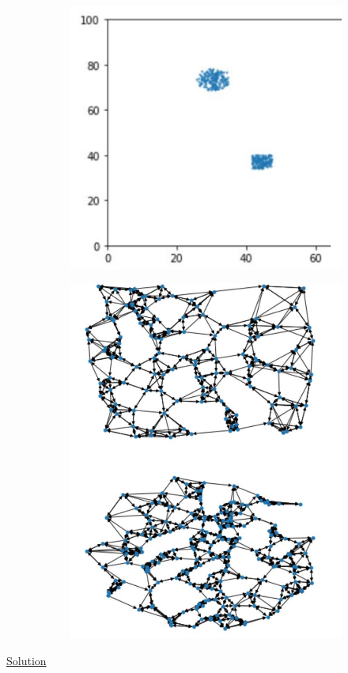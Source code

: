 \begin{figure}[ht]
	\centering
	\begin{subfigure}{.5\textwidth}
		\centering
		\includegraphics[width=0.8\linewidth]{figure_ml/ex_pytorch1}
	\end{subfigure}%
	\begin{subfigure}{.5\textwidth}
		\centering
		\includegraphics[width=0.6\linewidth]{figure_ml/ex_pytorch2}
	\end{subfigure}%
\end{figure}
\FloatBarrier

\href{https://colab.research.google.com/drive/1dPSV1ADBf2oxRyUJeEKeR0VC9ngP02lm#scrollTo=3ke3AYJhuSEY}{Solution}


